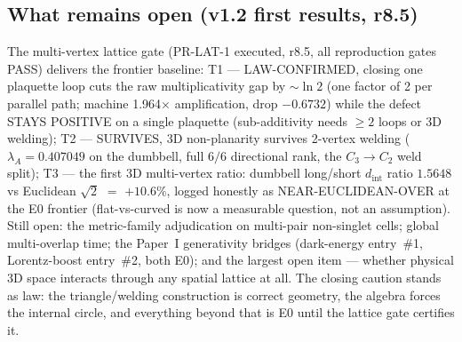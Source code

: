 \documentclass[11pt,a4paper]{article}
\theoremstyle{definition}
\begin{document}
\subsection*{What remains open (v1.2 first results, r8.5)}
The multi-vertex lattice gate (PR-LAT-1 executed, r8.5, all
reproduction gates PASS) delivers the frontier baseline:
T1 --- LAW-CONFIRMED, closing one plaquette loop cuts the raw
multiplicativity gap by $\sim\ln 2$ (one factor of 2 per parallel
path; machine 1.964$\times$ amplification, drop $-0.6732$) while
the defect STAYS POSITIVE on a single plaquette (sub-additivity
needs $\ge 2$ loops or 3D welding); T2 --- SURVIVES, 3D
non-planarity survives 2-vertex welding
($\lambda_A = 0.407049$ on the dumbbell, full $6/6$ directional
rank, the $C_3\!\to\! C_2$ weld split); T3 --- the first 3D
multi-vertex ratio: dumbbell long/short $d_{\mathrm{int}}$ ratio
$1.5648$ vs Euclidean $\sqrt{2}$ $=$ $+10.6\%$, logged honestly as
NEAR-EUCLIDEAN-OVER at the E0 frontier (flat-vs-curved is now a
measurable question, not an assumption). Still open: the
metric-family adjudication on multi-pair non-singlet cells;
global multi-overlap time; the Paper~I generativity bridges
(dark-energy entry~\#1, Lorentz-boost entry~\#2, both E0); and the
largest open item --- whether physical 3D space interacts through
any spatial lattice at all. The closing caution stands as law:
the triangle/welding construction is correct geometry, the algebra
forces the internal circle, and everything beyond that is E0
until the lattice gate certifies it.
\end{document}
